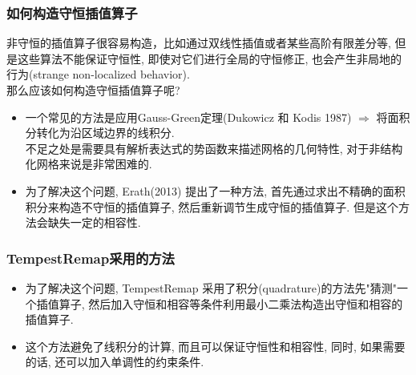\documentclass[unknownkeysallowed]{beamer}
\begin{document}
\begin{spacing}{1.2}
\begin{frame}
\frametitle{如何构造守恒插值算子}
非守恒的插值算子很容易构造，比如通过双线性插值或者某些高阶有限差分等, 但是这些算法不能保证守恒性, 即使对它们进行全局的守恒修正, 也会产生非局地的行为(strange non-localized behavior).
\\
\pause
\textcolor[rgb]{0,0,1}{那么应该如何构造守恒插值算子呢?}
\begin{itemize}%
\pause
\item 一个常见的方法是应用Gauss-Green定理(Dukowicz 和 Kodis 1987) $\Rightarrow$ 将面积分转化为沿区域边界的线积分. \\
\pause
 不足之处是需要具有解析表达式的势函数来描述网格的几何特性, 对于非结构化网格来说是非常困难的.
\pause
\item 为了解决这个问题, Erath(2013) 提出了一种方法, 首先通过求出不精确的面积积分来构造不守恒的插值算子, 然后重新调节生成守恒的插值算子. 但是这个方法会缺失一定的相容性.
\end{itemize}
\end{frame}


\begin{frame}
\frametitle{TempestRemap采用的方法}
\begin{itemize}
\pause
\item 为了解决这个问题, TempestRemap 采用了积分(quadrature)的方法先"猜测"一个插值算子, 然后加入守恒和相容等条件利用最小二乘法构造出守恒和相容的插值算子.%
\pause
\item 这个方法避免了线积分的计算, 而且可以保证守恒性和相容性, 同时, 如果需要的话, 还可以加入单调性的约束条件.
\end{itemize}
\end{frame}



\end{spacing}
\end{document}
